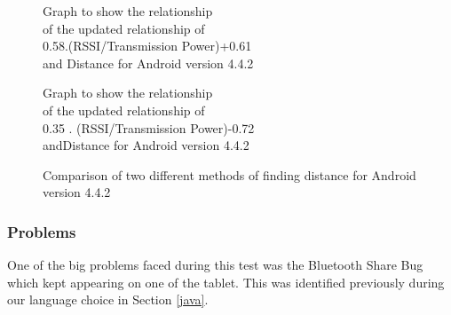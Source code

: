 \begin{figure}
\centering
\begin{minipage}{.5\textwidth}
\caption{Graph to show the relationship \\of the updated relationship of \\0.58.(RSSI/Transmission Power)+0.61\\and Distance for Android version 4.4.2}
\label{oldRSSIDistance}
\end{minipage}%
\begin{minipage}{.5\textwidth}
\caption{Graph to show the relationship\\of the updated relationship of\\0.35 . (RSSI/Transmission Power)-0.72\\andDistance for Android version 4.4.2}
\label{distanceUpdatedNew}
\end{minipage}
\caption{Comparison of two different methods of finding distance for Android version 4.4.2}
\label{ComparisonOfUpdateRelationship}
\end{figure}





\subsubsection{Problems}
One of the big problems faced during this test was the Bluetooth Share Bug\cite{bluetooth-share} which kept appearing on one of the tablet. This was identified previously during our language choice in Section \ref{java}. 

